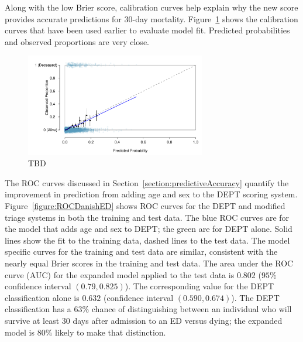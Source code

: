 Along with the low Brier score, calibration curves help explain why the new score provides accurate predictions for 30-day mortality.  Figure~\ref{figure:predVsObsMort30CalibrateAgeLT100DanishEDValid} shows the calibration curves that have been used earlier to evaluate model fit.  Predicted probabilities and observed proportions are very close.

\begin{figure}[!tbh]
  \centering
  \includegraphics[width=0.70\textwidth]
  {ch_logistic_regression_oi_biostat/figures/predVsObsMort30CalibrateAgeLT100DanishEDValid/predVsObsMort30CalibrateAgeLT100DanishEDValid.pdf} 
    \caption{TBD}
    \label{figure:predVsObsMort30CalibrateAgeLT100DanishEDValid}
\end{figure}


The ROC curves discussed in Section~\ref{section:predictiveAccuracy} quantify the improvement in prediction from adding age and sex to the DEPT scoring system.   Figure~\ref{figure:ROCDanishED} shows ROC curves for the DEPT and modified triage systems in both the training and test data.  The blue ROC curves are for the model that adds age and sex to DEPT; the green are for DEPT alone.  Solid lines show the fit to the training data, dashed lines to the test data.  The model specific curves for the training and test data are similar, consistent with the nearly equal Brier scores in the training and test data.  The area under the ROC curve (AUC) for the expanded model applied to the test data is $0.802$ ($95\%$ confidence interval $(0.79, 0.825)$). The corresponding value for the DEPT classification alone is $0.632$ (confidence interval $(0.590,0.674)$).  The DEPT classification has a $63\%$ chance of distinguishing between an individual who will survive at least 30 days after admission to an ED versus dying; the expanded model is $80\%$ likely to make that distinction.


